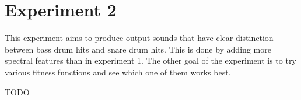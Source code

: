 \section{Experiment 2}
This experiment aims to produce output sounds that have clear distinction between bass drum hits and snare drum hits. This is done by adding more spectral features than in experiment 1. The other goal of the experiment is to try various fitness functions and see which one of them works best.

TODO